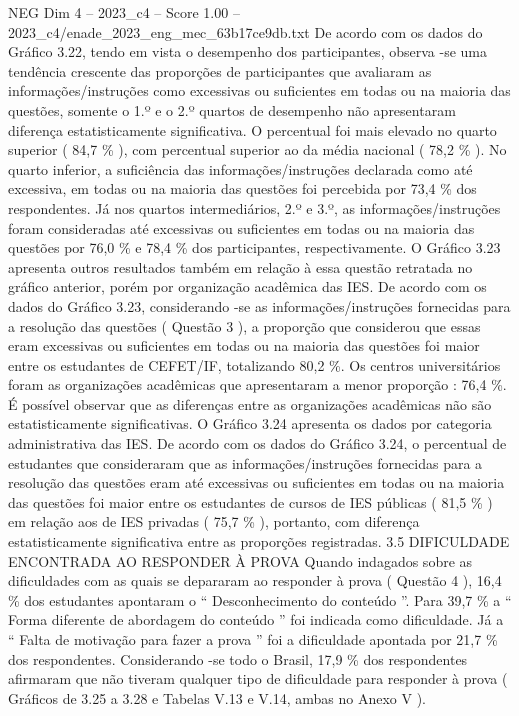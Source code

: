 \begin{textsample}{NEG Dim 4 – 2023\_c4 – Score 1.00 – 2023\_c4/enade\_2023\_eng\_mec\_63b17ce9db.txt}
De acordo com os dados do Gráfico 3.22, tendo em vista o desempenho dos participantes, observa -se uma tendência crescente das proporções de participantes que avaliaram as informações/instruções como excessivas ou suficientes em todas ou na maioria das questões, somente o 1.º e o 2.º quartos de desempenho não apresentaram diferença estatisticamente significativa.
O percentual foi mais elevado no quarto superior ( 84,7 \% ), com percentual superior ao da média nacional ( 78,2 \% ).
No quarto inferior, a suficiência das informações/instruções declarada como até excessiva, em todas ou na maioria das questões foi percebida por 73,4 \% dos respondentes.
Já nos quartos intermediários, 2.º e 3.º, as informações/instruções foram consideradas até excessivas ou suficientes em todas ou na maioria das questões por 76,0 \% e 78,4 \% dos participantes, respectivamente.
O Gráfico 3.23 apresenta outros resultados também em relação à essa questão retratada no gráfico anterior, porém por organização acadêmica das IES.
De acordo com os dados do Gráfico 3.23, considerando -se as informações/instruções fornecidas para a resolução das questões ( Questão 3 ), a proporção que considerou que essas eram excessivas ou suficientes em todas ou na maioria das questões foi maior entre os estudantes de CEFET/IF, totalizando 80,2 \%.
Os centros universitários foram as organizações acadêmicas que apresentaram a menor proporção : 76,4 \%.
É possível observar que as diferenças entre as organizações acadêmicas não são estatisticamente significativas.
O Gráfico 3.24 apresenta os dados por categoria administrativa das IES.
De acordo com os dados do Gráfico 3.24, o percentual de estudantes que consideraram que as informações/instruções fornecidas para a resolução das questões eram até excessivas ou suficientes em todas ou na maioria das questões foi maior entre os estudantes de cursos de IES públicas ( 81,5 \% ) em relação aos de IES privadas ( 75,7 \% ), portanto, com diferença estatisticamente significativa entre as proporções registradas. 3.5 DIFICULDADE ENCONTRADA AO RESPONDER À PROVA Quando indagados sobre as dificuldades com as quais se depararam ao responder à prova ( Questão 4 ), 16,4 \% dos estudantes apontaram o “ Desconhecimento do conteúdo ”.
Para 39,7 \% a “ Forma diferente de abordagem do conteúdo ” foi indicada como dificuldade.
Já a “ Falta de motivação para fazer a prova ” foi a dificuldade apontada por 21,7 \% dos respondentes.
Considerando -se todo o Brasil, 17,9 \% dos respondentes afirmaram que não tiveram qualquer tipo de dificuldade para responder à prova ( Gráficos de 3.25 a 3.28 e Tabelas V.13 e V.14, ambas no Anexo V ).

\end{textsample}
